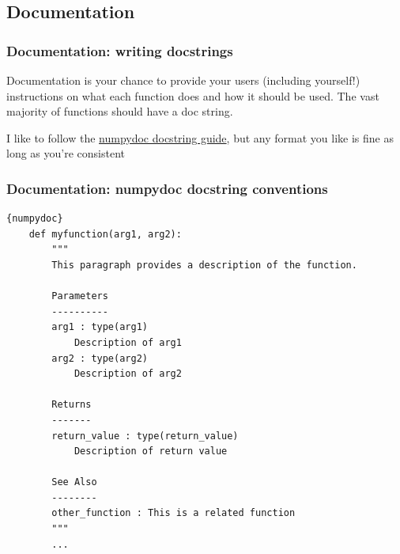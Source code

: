 \documentclass[10pt]{beamer}
\begin{document}
  \subsection{Documentation}

  \begin{frame} \frametitle{Documentation: writing docstrings}

    Documentation is your chance to provide your users (including yourself!) instructions
    on what each function does and how it should be used. The vast majority of functions
    should have a doc string.

    \vspace{0.25cm}

    I like to follow the
    \href{https://numpydoc.readthedocs.io/en/latest/format.html}{numpydoc docstring guide},
    but any format you like is fine as long as you're consistent

  \end{frame}

  \begin{frame}[fragile] \frametitle{Documentation: numpydoc docstring conventions}

    \begin{lstlisting}{numpydoc}
    def myfunction(arg1, arg2):
        """
        This paragraph provides a description of the function.

        Parameters
        ----------
        arg1 : type(arg1)
            Description of arg1
        arg2 : type(arg2)
            Description of arg2

        Returns
        -------
        return_value : type(return_value)
            Description of return value

        See Also
        --------
        other_function : This is a related function
        """
        ...
    \end{lstlisting}

  \end{frame}
\end{document}
